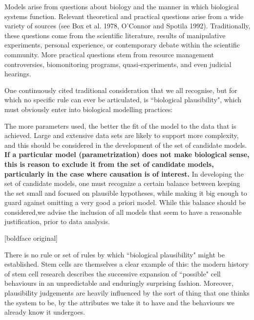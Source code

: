 \begin{longquote}
Models
arise from questions about biology and the manner in which biological systems function. Relevant theoretical and practical questions arise from a wide
variety of sources (see Box et al. 1978, O’Connor and Spotila 1992). Traditionally, these questions come from the scientific literature, results of manipulative
experiments, personal experience, or contemporary debate within the scientific community. More practical questions stem from resource management
controversies, biomonitoring programs, quasi-experiments, and even judicial
hearings.
\cite[p.16]{Burnham2002}
\end{longquote}


 One continuously cited traditional consideration that we all recognise, but for which no specific rule can ever be articulated, is ``biological plausibility", which must obviously enter into biological modelling practices:

\begin{longquote}
The more parameters used, the better the fit of the model to the data that is
achieved. Large and extensive data sets are likely to support more complexity,
and this should be considered in the development of the set of candidate models.
\textbf{If a particular model (parametrization) does not make biological sense,
this is reason to exclude it from the set of candidate models, particularly
in the case where causation is of interest.} In developing the set of candidate
models, one must recognize a certain balance between keeping the set small
and focused on plausible hypotheses, while making it big enough to guard
against omitting a very good a priori model. While this balance should be
considered,we advise the inclusion of all models that seem to have a reasonable
justification, prior to data analysis.\cite[p.17]{Burnham2002}

[boldface original]

\end{longquote}

There is no rule or set of rules by which ``biological plausibility" might be established. Stem cells are themselves a clear example of this: the modern history of stem cell research describes the successive expansion of ``possible" cell behaviours in an unpredictable and enduringly surprising fashion. Moreover, plausibility judgements are heavily influenced by the sort of thing that one thinks the system to be, by the attributes we take it to have and the behaviours we already know it undergoes.

